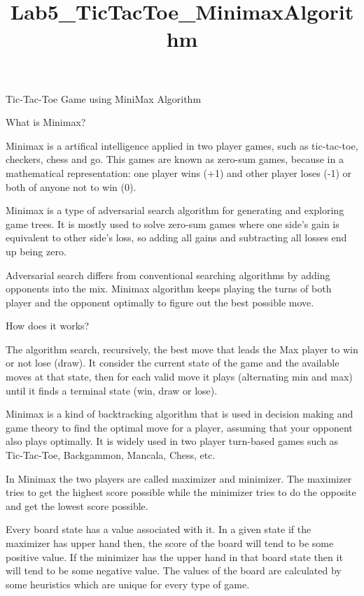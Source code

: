 \documentclass[11pt]{article}
\title{Lab5\_TicTacToe\_MinimaxAlgorithm}
\begin{document}
    
    \maketitle
    
    

    
    Tic-Tac-Toe Game using MiniMax Algorithm

    What is Minimax?

Minimax is a artifical intelligence applied in two player games, such as
tic-tac-toe, checkers, chess and go. This games are known as zero-sum
games, because in a mathematical representation: one player wins (+1)
and other player loses (-1) or both of anyone not to win (0).

Minimax is a type of adversarial search algorithm for generating and
exploring game trees. It is mostly used to solve zero-sum games where
one side's gain is equivalent to other side's loss, so adding all gains
and subtracting all losses end up being zero.

Adversarial search differs from conventional searching algorithms by
adding opponents into the mix. Minimax algorithm keeps playing the turns
of both player and the opponent optimally to figure out the best
possible move.

    How does it works?

The algorithm search, recursively, the best move that leads the Max
player to win or not lose (draw). It consider the current state of the
game and the available moves at that state, then for each valid move it
plays (alternating min and max) until it finds a terminal state (win,
draw or lose).

Minimax is a kind of backtracking algorithm that is used in decision
making and game theory to find the optimal move for a player, assuming
that your opponent also plays optimally. It is widely used in two player
turn-based games such as Tic-Tac-Toe, Backgammon, Mancala, Chess, etc.

In Minimax the two players are called maximizer and minimizer. The
maximizer tries to get the highest score possible while the minimizer
tries to do the opposite and get the lowest score possible.

Every board state has a value associated with it. In a given state if
the maximizer has upper hand then, the score of the board will tend to
be some positive value. If the minimizer has the upper hand in that
board state then it will tend to be some negative value. The values of
the board are calculated by some heuristics which are unique for every
type of game.
\end{document}
